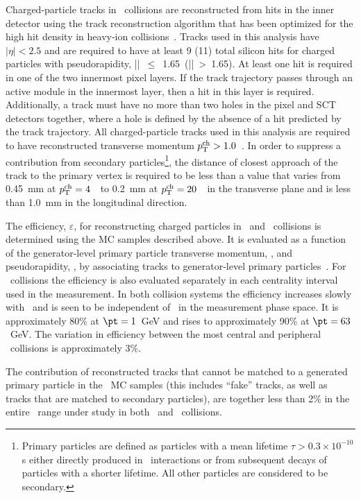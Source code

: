 Charged-particle tracks in \pbpb\ collisions are reconstructed from hits in the inner detector using the 
track reconstruction algorithm that has been optimized for the high hit density in heavy-ion
collisions~\cite{Aaboud:2017all}.
Tracks used in this analysis have $|\eta| < 2.5$ and are required to have at least 9 (11) total silicon hits for charged particles with pseudorapidity,  \mbox{|\etatrk| $\leq$ 1.65 (|\etatrk| > 1.65)}.  At least one hit is required in one of the two innermost pixel layers.
If the track trajectory passes through an active module in the innermost layer, then 
a hit in this layer is required. Additionally, a track must 
have no more than two holes in the pixel and SCT detectors together, where 
a hole is defined by the absence of a hit predicted by the track 
trajectory. 
All charged-particle tracks used in this analysis are required to have reconstructed transverse momentum $\mbox{$p_{\mathrm{T}}^{\mathrm{ch}}$} > 1.0 $~\GeV. In order to suppress a contribution from
secondary particles\footnote{Primary particles are defined as particles with a mean lifetime $\tau>0.3\times 10^{-10}$s either directly produced in \pp\ interactions or from subsequent decays of particles with a shorter lifetime. All other particles are considered to be secondary.}, the distance of closest approach of the track to the primary vertex is required to be less than a value that varies from 0.45~mm at $\mbox{$p_{\mathrm{T}}^{\mathrm{ch}}$}=4$~\GeV\ to 0.2~mm at $\mbox{$p_{\mathrm{T}}^{\mathrm{ch}}$}=20$~\GeV\ in the transverse plane and is less than 1.0~mm in the longitudinal direction.


The efficiency, $\varepsilon$, for reconstructing charged particles in \PbPb\ and \pp\ collisions is determined using the MC samples described above. It is evaluated as a function of the generator-level primary particle transverse momentum, \pTtrue, and pseudorapidity, \etatrue, by associating tracks to generator-level primary particles~\cite{Aad:2010ah}. For \pbpb\ collisions the efficiency is also evaluated separately in each centrality interval used in the measurement. In both collision systems the efficiency increases slowly with \pTtrue\ and is seen to be independent of \ptjet\ in the measurement phase space. It is approximately 80\% at \mbox{$\pt = 1$ GeV} and rises to approximately 90\% at \mbox{$\pt = 63$ GeV}. The variation in efficiency between the most central and peripheral \pbpb\ collisions is approximately 3\%.

The contribution of reconstructed tracks that cannot be matched to a generated primary particle in the \pp\ MC samples (this includes ``fake'' tracks, as well as tracks that are matched to secondary particles), are together less than 2\% in the entire \pttrk\ range under study in both \pp\ and \pbpb\ collisions.  








